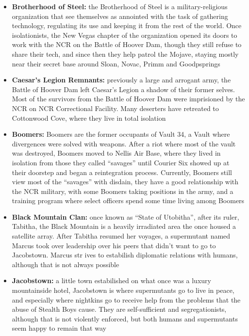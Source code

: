 \documentclass[11pt]{article} %
\begin{document}
\begin{itemize}
\item \textbf{Brotherhood of Steel:} the Brotherhood of Steel is a military-religious organization that see themselves as annointed with the task of gathering technology, regulating its use and keeping it from the rest of the world. Once isolationists, the New Vegas chapter of the organization opened its doors to work with the NCR on the Battle of Hoover Dam, though they still refuse to share their tech, and since then they help patrol the Mojave, staying mostly near their secret base around Sloan, Novac, Primm and Goodpsprings 

\item \textbf{Caesar's Legion Remnants:} previously a large and arrogant army, the Battle of Hoover Dam left Caesar's Legion a shadow of their former selves. Most of the survivors from the Battle of Hoover Dam were imprisioned by the NCR on NCR Correctional Facility. Many deserters have retreated to Cottonwood Cove, where they live in total isolation

\item \textbf{Boomers:} Boomers are the former occupants of Vault 34, a Vault where divergences were solved with weapons. After a riot where most of the vault was destroyed, Boomers moved to Nellis Air Base, where they lived in isolation from those they called ``savages'' until Courier Six showed up at their doorstep and began a reintegration process. Currently, Boomers still view most of the ``savages'' with disdain, they have a good relationship with the NCR military, with some Boomers taking positions in the army, and a training program where select officers spend some time living among Boomers

\item \textbf{Black Mountain Clan:} once known as ``State of Utobitha'', after its ruler, Tabitha, the Black Mountain is a heavily irradiated area the once housed a satellite array. After Tabitha resumed her voyages, a supermutant named Marcus took over leadership over his peers that didn't want to go to Jacobstown. Marcus str
ives to estabilish diplomatic relations with humans, although that is not always possible

\item \textbf{Jacobstown:} a little town estabilished on what once was a luxury mountainside hotel, Jacobstown is where supermutants go to live in peace, and especially where nightkins go to receive help from the problems that the abuse of Stealth Boys cause. They are self-sufficient and segregationists, although that is not violently enforced, but both humans and supermutants seem happy to remain that way


\end{itemize}
\end{document}
